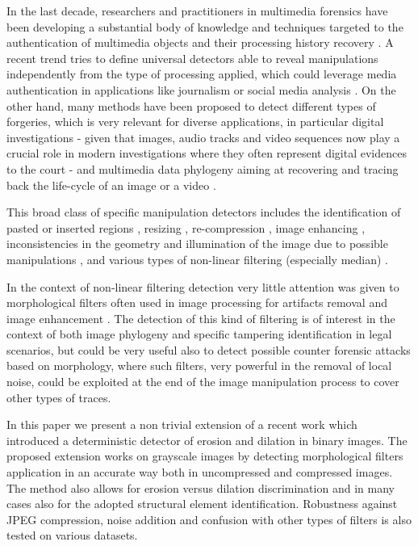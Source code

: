 \documentclass[review]{elsarticle}
\begin{document}
In the last decade, researchers and practitioners in multimedia forensics have been developing a substantial body of knowledge and techniques targeted to the authentication of multimedia objects and their processing history recovery \cite{stamm_overview, farid_book, ho, piva_overview, sencar_book}. 
A recent trend tries to define universal detectors able to reveal manipulations independently from the type of processing applied, which could leverage media authentication in applications like journalism or social media analysis \cite{noiseprint}. 
On the other hand, many methods have been proposed to detect different types of forgeries, which is very relevant for diverse applications, in particular digital investigations - given that images, audio tracks and video sequences now play a crucial role in modern investigations where they often represent digital evidences to the court \cite{forlab} - and multimedia data phylogeny aiming at recovering and tracing back the life-cycle of an image or a video \cite{Bestagini2016, Dias2012, Oliveira2016, Costa2014}.

This broad class of specific manipulation detectors includes the identification of pasted or inserted regions \cite{cm2, cm3, cm4, spl2, spl3}, resizing \cite{fernando2017}, re-compression \cite{PBPG2017-TIFS},  image enhancing \cite{shan2019robust}, inconsistencies in the geometry and illumination of the image due to possible manipulations \cite{geom1, geom2, phys1}, and various types of non-linear filtering (especially median) \cite{Bahrami2015, Cao2014, Cao2011, Fridrich2010, Tian2010, Yuan:2011, Liu2013, Huang2013, Shi2014, Wang2015, gao2019robust}. 

In the context of non-linear filtering detection 
very little attention was given to morphological filters \cite{haas1967morphologie} often used in image processing for artifacts removal and image enhancement \cite{British2012} \cite{Maragos2004}. The detection of this kind of filtering is of interest in the context of both image phylogeny and specific tampering identification in legal scenarios, but could be very useful also to detect possible counter forensic attacks based on morphology, where such filters, very powerful in the removal of local noise, could be exploited at the end of the image manipulation process to cover other types of traces. 

In this paper we present a non trivial extension of a recent work \cite{de2017detecting} which introduced a deterministic detector of erosion and dilation in binary images. The proposed extension works on grayscale images by detecting morphological filters application in an accurate way both in uncompressed and compressed images. The method also allows for erosion versus dilation discrimination and in many cases also for the adopted structural element identification. 
Robustness against JPEG compression, noise addition and confusion with other types of filters is also tested on various datasets. 
\end{document}
